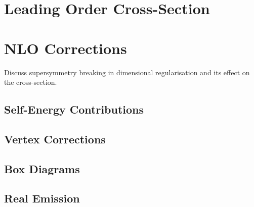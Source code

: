 


\section{Leading Order Cross-Section}

\section{NLO Corrections}
    \begin{TODO}
        \item Discuss supersymmetry breaking in dimensional regularisation and its effect on the cross-section.
    \end{TODO}
    \subsection{Self-Energy Contributions}

    \subsection{Vertex Corrections}

    \subsection{Box Diagrams}

    \subsection{Real Emission}
